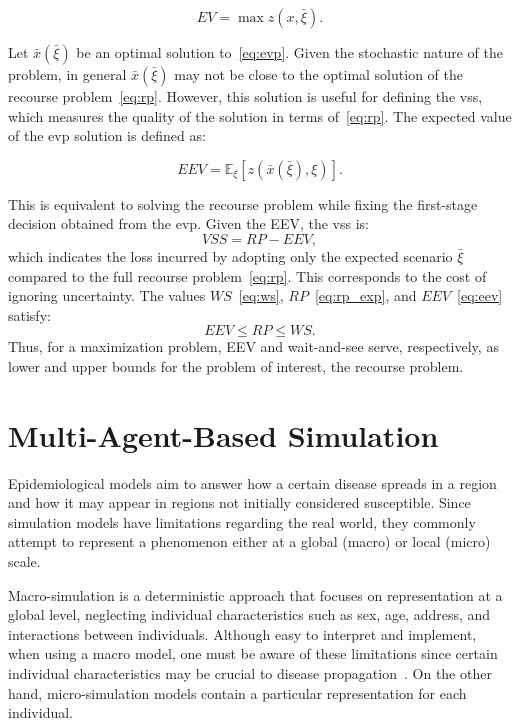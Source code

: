 \begin{equation}
	EV = \max z(x, \bar{\xi}).
	\label{eq:evp}
\end{equation}

Let $\bar{x}(\bar{\xi})$ be an optimal solution to~\eqref{eq:evp}. Given the
stochastic nature of the problem, in general $\bar{x}(\bar{\xi})$ may not be
close to the optimal solution of the recourse problem~\eqref{eq:rp}. However,
this solution is useful for defining the \gls{vss}, which measures the quality
of the solution in terms of~\eqref{eq:rp}. The expected value of the \gls{evp}
solution is defined as:

\begin{equation}
	EEV = \mathbb{E}_{\xi} \left[ z(\bar{x}(\bar{\xi}), \xi) \right].
	\label{eq:eev}
\end{equation}

This is equivalent to solving the recourse problem while fixing the first-stage
decision obtained from the \gls{evp}. Given the EEV, the \gls{vss} is:
\[
	VSS = RP - EEV,
\]
which indicates the loss incurred by adopting only the expected scenario
$\bar{\xi}$ compared to the full recourse problem~\eqref{eq:rp}. This
corresponds to the cost of ignoring uncertainty. The values $WS$~\eqref{eq:ws},
$RP$~\eqref{eq:rp_exp}, and $EEV$~\eqref{eq:eev} satisfy:
\[
	EEV \leq RP \leq WS.
\]
Thus, for a maximization problem, EEV  and wait-and-see serve, respectively, as
lower and upper bounds for the problem of interest, the recourse problem.

\section{Multi-Agent-Based Simulation}\label{sec:multi-agent-simulation}

Epidemiological models aim to answer how a certain disease spreads in a region
and how it may appear in regions not initially considered susceptible. Since
simulation models have limitations regarding the real world, they commonly
attempt to represent a phenomenon either at a global (macro) or local (micro)
scale.

Macro-simulation is a deterministic approach that focuses on representation at a
global level, neglecting individual characteristics such as sex, age, address,
and interactions between individuals. Although easy to interpret and implement,
when using a macro model, one must be aware of these limitations since certain
individual characteristics may be crucial to disease
propagation~\citep{damien:2017}. On the other hand, micro-simulation models
contain a particular representation for each individual.

